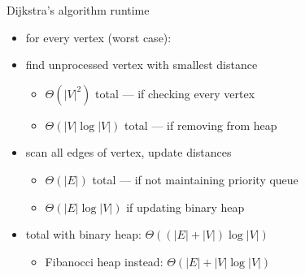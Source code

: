\begin{frame}{Dijkstra's algorithm runtime}
\begin{itemize}
\item for every vertex (worst case):
\vspace{.5cm}
\item find unprocessed vertex with smallest distance
    \begin{itemize}
    \item $\Theta(|V|^2)$ total --- if checking every vertex
    \item $\Theta(|V|\log|V|)$ total --- if removing from heap
    \end{itemize}
\item scan all edges of vertex, update distances
    \begin{itemize}
    \item $\Theta(|E|)$ total --- if not maintaining priority queue
    \item $\Theta(|E|\log|V|)$ if updating binary heap
    \end{itemize}
\vspace{.5cm}
\item total with binary heap: $\Theta((|E|+|V|)\log|V|)$
    \begin{itemize}
    \item Fibanocci heap instead: $\Theta(|E|+|V|\log|V|)$
    \end{itemize}
\end{itemize}
\end{frame}
